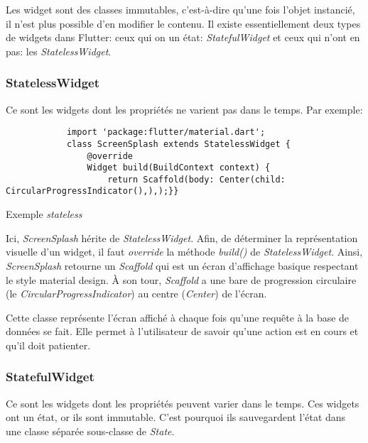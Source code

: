Les widget sont des classes immutables, c'est-à-dire qu'une fois l'objet instancié, il n'est plus possible d'en modifier le contenu.
Il existe essentiellement deux types de widgets dans Flutter: ceux qui on un état: \textit{StatefulWidget} et ceux qui n'ont en pas:
les \textit{StatelessWidget}.

\subsubsection*{StatelessWidget}
Ce sont les widgets dont les propriétés ne varient pas dans le temps. Par exemple:

\begin{listing}[h]
    \begin{verbatim}
            import 'package:flutter/material.dart';
            class ScreenSplash extends StatelessWidget {
                @override
                Widget build(BuildContext context) {
                    return Scaffold(body: Center(child: CircularProgressIndicator(),),);}}
        \end{verbatim}
    \caption{Exemple \textit{stateless}}
    \label{code:statelessExample}
\end{listing}

Ici, \textit{ScreenSplash} hérite de \textit{StatelessWidget}. Afin, de déterminer la représentation visuelle d'un widget,
il faut \textit{override} la méthode \textit{build()} de \textit{StatelessWidget}. Ainsi, \textit{ScreenSplash} retourne un \textit{Scaffold}
qui est un écran d'affichage basique respectant le style material design. À son tour,
\textit{Scaffold} a une bare de progression circulaire (le \textit{CircularProgressIndicator}) au centre (\textit{Center}) de l'écran.

Cette classe représente l'écran affiché à chaque fois qu'une requête à la base de données se fait. Elle permet à l'utilisateur de savoir qu'une action
est en cours et qu'il doit patienter.
\newpage
\subsubsection*{StatefulWidget}
Ce sont les widgets dont les propriétés peuvent varier dans le temps. Ces widgets ont un état, or ils sont immutable. C'est pourquoi ils sauvegardent
l'état dans une classe séparée  sous-classe de \textit{State}.

